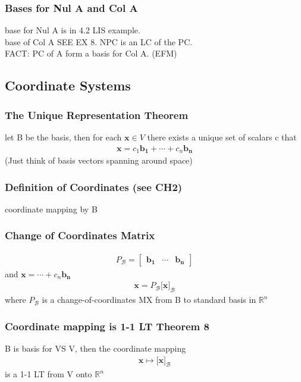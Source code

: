 \documentclass[12pt]{article}
\newcommand{\R}{\mathbb{R}}
\begin{document}
    \subsubsection{Bases for Nul A and Col A}
        base for Nul A is in 4.2 LIS example.\\
        base of Col A SEE EX 8. NPC is an LC of the PC. \\
        FACT: PC of A form a basis for Col A. (EFM)
\subsection{Coordinate Systems}
    \subsubsection{The Unique Representation Theorem}
        let B be the basis, then for each $\bm{x}\in V$  there
        exists a unique set of scalars c that
        \begin{align*}
            \bm{x} = c_{1}\bm{b_{1}}+ \cdots + c_{n}\bm{b_{n}} 
        \end{align*}
        (Just think of basis vectors spanning around space)
        \subsubsection{Definition of Coordinates (see CH2)}
            coordinate mapping by B
        \subsubsection{Change of Coordinates Matrix}
            \begin{align*}
                P_{\mathcal{B}} = \begin{bmatrix}
                \bm{b_{1}} & \cdots & \bm{b_{n}}
                \end{bmatrix}
            \end{align*}
            and $ \bm{x} = \cdots+ c_{n}\bm{b_{n}} $  
            \begin{align*}
                \bm{x} = P_{\mathcal{B}} \big[\bm{x}\big]_{\mathcal{B}}
            \end{align*}
            where $P_{\mathcal{B}}$ is a change-of-coordinates MX from B
            to standard basis in $\R^n$ 
        \subsubsection{Coordinate mapping is 1-1 LT Theorem 8}
            B is basis for VS V, then the coordinate mapping
            \begin{align*}
                \bm{x} \mapsto \big[\bm{x}\big]_{\mathcal{B}}
            \end{align*}
            is a 1-1 LT from V onto $\R^n$ 
\end{document}
